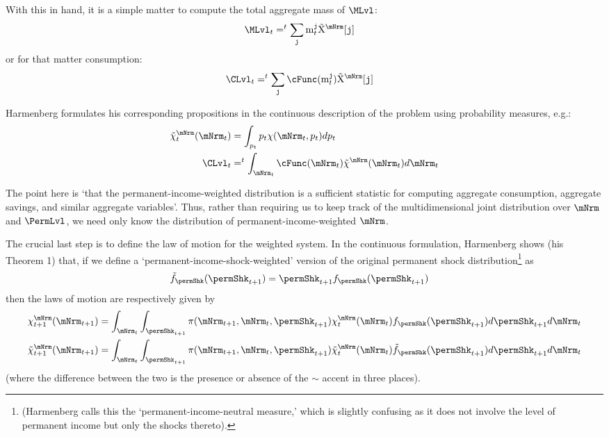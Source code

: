 \documentclass[\econtexRoot/BufferStockTheory]{subfiles}
\begin{document}
With this in hand, it is a simple matter to compute the total aggregate mass of $\MLvl$:
\begin{align}
  \MLvl_{t} & = \PermGroFac^{t} \sum_{\nmNrmVecNow} \mNrmVecNow \mpMatMargWgt[\nmNrmVecNow]
\end{align}
or for that matter consumption:
\begin{align}
  \CLvl_{t} & = \PermGroFac^{t} \sum_{\nmNrmVecNow} \cFunc(\mNrmVecNow) \mpMatMargWgt[\nmNrmVecNow]
\end{align}

Harmenberg formulates his corresponding propositions in the continuous description of the problem using probability measures, e.g.:
\begin{align}
  \mpPrbMargWgt_{t}(\mNrmNow) & = \int_{\PermLvlNow} \PermLvlNow \mpPrb(\mNrmNow,\PermLvlNow) d \PermLvlNow
\\ \CLvl_{t} & = \PermGroFac^{t} \int_{\mNrmNow} \cFunc(\mNrmNow) \mpPrbMargWgt(\mNrmNow)                             d \mNrmNow
\end{align}

The point here is `that the permanent-income-weighted distribution is a sufficient statistic for computing aggregate consumption, aggregate savings, and similar aggregate variables'.  Thus, rather than requiring us to keep track of the multidimensional joint distribution over $\mNrm$ and $\PermLvl$, we need only know the distribution of permanent-income-weighted $\mNrm$.

The crucial last step is to define the law of motion for the weighted system.  In the continuous formulation, Harmenberg shows (his Theorem 1) that, if we define a `permanent-income-shock-weighted' version of the original permanent shock distribution\footnote{(Harmenberg calls this the `permanent-income-neutral measure,' which is slightly confusing as it does not involve the level of permanent income but only the shocks thereto).} as
\begin{align}
  \permShkWgtPrb(\permShkPrbNxt) & = \permShkPrbNxt \permShkRawPrb(\permShkPrbNxt)
\end{align}
then the laws of motion are respectively given by 
\begin{equation}\begin{aligned}
  \mpPrbMargRaw_{t+1}(\mNrmNxt) & = \int_{\mNrmNow} \int_{\permShkPrbNxt} \lomdkPrb(\mNrmNxt,\mNrmNow,\permShkPrbNxt) \mpPrbMargRaw_{t}(\mNrmNow) \permShkRawPrb(\permShkPrbNxt) d \permShkPrbNxt d \mNrmNow
  \\
  \mpPrbMargWgt_{t+1}(\mNrmNxt) & = \int_{\mNrmNow} \int_{\permShkPrbNxt} \lomdkPrb(\mNrmNxt,\mNrmNow,\permShkPrbNxt) \mpPrbMargWgt_{t}(\mNrmNow) \permShkWgtPrb(\permShkPrbNxt) d \permShkPrbNxt d \mNrmNow
\end{aligned}\end{equation}
(where the difference between the two is the presence or absence of the $\sim$ accent in three places).
\end{document}
